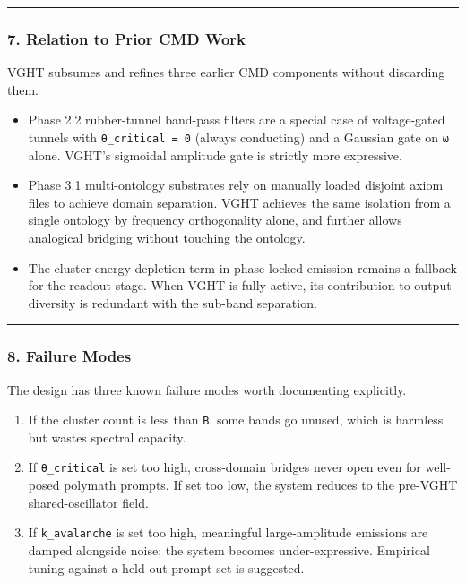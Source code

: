 \documentclass[
  11pt,
  a4paper,
]{article}
\providecommand{\tightlist}{%
  \setlength{\itemsep}{0pt}\setlength{\parskip}{0pt}}
\begin{document}
\begin{center}\rule{0.5\linewidth}{0.5pt}\end{center}

\subsubsection{7. Relation to Prior CMD
Work}\label{relation-to-prior-cmd-work}

VGHT subsumes and refines three earlier CMD components without
discarding them.

\begin{itemize}
\tightlist
\item
  Phase 2.2 rubber-tunnel band-pass filters are a special case of
  voltage-gated tunnels with \texttt{θ\_critical\ =\ 0} (always
  conducting) and a Gaussian gate on \texttt{ω} alone. VGHT's sigmoidal
  amplitude gate is strictly more expressive.
\item
  Phase 3.1 multi-ontology substrates rely on manually loaded disjoint
  axiom files to achieve domain separation. VGHT achieves the same
  isolation from a single ontology by frequency orthogonality alone, and
  further allows analogical bridging without touching the ontology.
\item
  The cluster-energy depletion term in phase-locked emission remains a
  fallback for the readout stage. When VGHT is fully active, its
  contribution to output diversity is redundant with the sub-band
  separation.
\end{itemize}

\begin{center}\rule{0.5\linewidth}{0.5pt}\end{center}

\subsubsection{8. Failure Modes}\label{failure-modes-3}

The design has three known failure modes worth documenting explicitly.

\begin{enumerate}
\def\labelenumi{\arabic{enumi}.}
\tightlist
\item
  If the cluster count is less than \texttt{B}, some bands go unused,
  which is harmless but wastes spectral capacity.
\item
  If \texttt{θ\_critical} is set too high, cross-domain bridges never
  open even for well-posed polymath prompts. If set too low, the system
  reduces to the pre-VGHT shared-oscillator field.
\item
  If \texttt{k\_avalanche} is set too high, meaningful large-amplitude
  emissions are damped alongside noise; the system becomes
  under-expressive. Empirical tuning against a held-out prompt set is
  suggested.
\end{enumerate}
\end{document}
